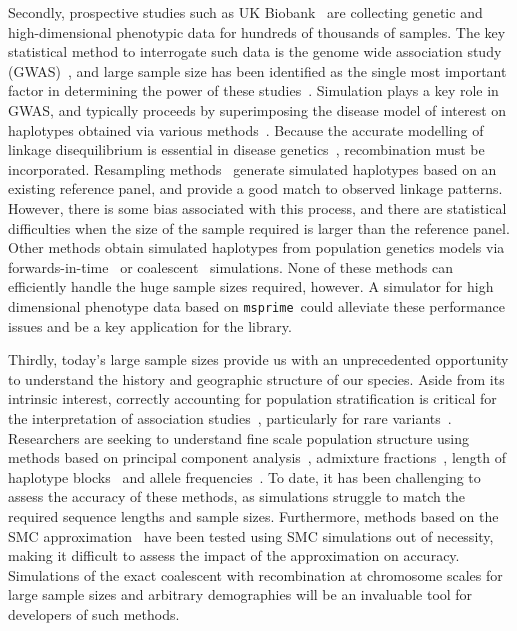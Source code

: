 \documentclass[10pt]{article}
\newcommand{\msprime}[0]{\texttt{msprime}}
\begin{document}
Secondly, prospective studies such as UK Biobank~\citep{c11,lsmj15} are collecting
genetic and high-dimensional phenotypic data  for hundreds of thousands of
samples. The key statistical method to interrogate such data is the genome wide
association study (GWAS)~\citep{m13}, and large sample size has been identified
as the single most important factor in determining the power of these
studies~\citep{ssdm09}. Simulation plays a key role in GWAS, and typically
proceeds by superimposing the disease model of interest on haplotypes obtained
via various methods~\citep{ylgv11}. Because the accurate modelling of linkage
disequilibrium is essential in disease genetics~\citep{sfgrda05},
recombination must be incorporated. Resampling
methods~\citep{mhmmd07,ll08,ssdm09,smd11} generate simulated haplotypes based
on an existing reference panel, and provide a good match to observed linkage
patterns. However, there is some bias associated with this process, and there are
statistical difficulties when the size of the sample required is larger than
the reference panel. Other methods obtain simulated haplotypes from
population genetics models via forwards-in-time~\citep{lisbh08,l14} or
coalescent~\citep{ggs11,cs13} simulations. None of these methods can efficiently
handle the huge sample sizes required, however. A simulator for high dimensional
phenotype data based on \msprime\ could alleviate these performance issues
and be a key application for the library.

Thirdly, today's large sample sizes provide us with an unprecedented
opportunity to understand the history and geographic structure of
our species. Aside from its intrinsic interest, correctly accounting for
population stratification is critical for the interpretation of association
studies~\citep{mclpd04,macglih08}, particularly for rare
variants~\citep{mm12,mm14}. Researchers are seeking to understand fine scale
population structure using methods based on principal component
analysis~\citep{njbk08}, admixture fractions~\citep{anl09,lhmf12,lnlbtb13},
length of haplotype blocks~\citep{rc13,hn13,bekv13} and allele
frequencies~\citep{ghwb09}. To date, it has been challenging to assess the
accuracy of these methods, as simulations struggle to match the required
sequence lengths and sample sizes. Furthermore, methods based on the SMC
approximation~\citep{ld11,sd14} have been tested using SMC simulations out of
necessity, making it difficult to assess the impact of the approximation on
accuracy. Simulations of the exact coalescent with recombination at chromosome
scales for large sample sizes and arbitrary demographies will be an invaluable
tool for developers of such methods.
\end{document}
